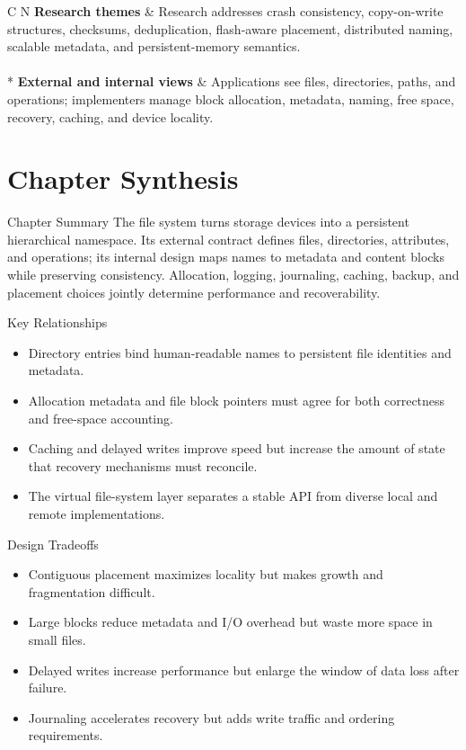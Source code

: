 \documentclass[10pt,letterpaper]{article}
\begin{document}
\begin{longtable}{C N}
\textbf{Research themes} & Research addresses crash consistency, copy-on-write structures, checksums, deduplication, flash-aware placement, distributed naming, scalable metadata, and persistent-memory semantics.\\\hline
{}\\*\hline
\textbf{External and internal views} & Applications see files, directories, paths, and operations; implementers manage block allocation, metadata, naming, free space, recovery, caching, and device locality.\\\hline
\end{longtable}
\normalsize

\section*{Chapter Synthesis}
\begin{studybox}{Chapter Summary}
The file system turns storage devices into a persistent hierarchical namespace. Its external contract defines files, directories, attributes, and operations; its internal design maps names to metadata and content blocks while preserving consistency. Allocation, logging, journaling, caching, backup, and placement choices jointly determine performance and recoverability.
\end{studybox}

\begin{studybox}{Key Relationships}
\begin{itemize}
  \item Directory entries bind human-readable names to persistent file identities and metadata.
  \item Allocation metadata and file block pointers must agree for both correctness and free-space accounting.
  \item Caching and delayed writes improve speed but increase the amount of state that recovery mechanisms must reconcile.
  \item The virtual file-system layer separates a stable API from diverse local and remote implementations.
\end{itemize}
\end{studybox}

\begin{studybox}{Design Tradeoffs}
\begin{itemize}
  \item Contiguous placement maximizes locality but makes growth and fragmentation difficult.
  \item Large blocks reduce metadata and I/O overhead but waste more space in small files.
  \item Delayed writes increase performance but enlarge the window of data loss after failure.
  \item Journaling accelerates recovery but adds write traffic and ordering requirements.
\end{itemize}
\end{studybox}
\end{document}
